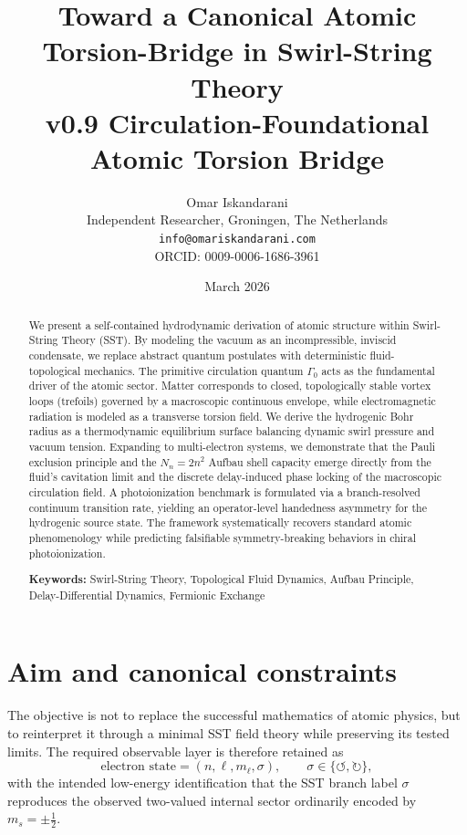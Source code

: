 \documentclass[11pt,a4paper]{article}
\title{Toward a Canonical Atomic Torsion-Bridge in Swirl-String Theory\\
\large v0.9 Circulation-Foundational Atomic Torsion Bridge}
\author{Omar Iskandarani \\
Independent Researcher, Groningen, The Netherlands \\
\texttt{info@omariskandarani.com} \\
ORCID: 0009-0006-1686-3961}
\date{March 2026}
\begin{document}
\maketitle

\begin{abstract}
We present a self-contained hydrodynamic derivation of atomic structure within Swirl-String Theory (SST). By modeling the vacuum as an incompressible, inviscid condensate, we replace abstract quantum postulates with deterministic fluid-topological mechanics. The primitive circulation quantum $\Gamma_0$ acts as the fundamental driver of the atomic sector. Matter corresponds to closed, topologically stable vortex loops (trefoils) governed by a macroscopic continuous envelope, while electromagnetic radiation is modeled as a transverse torsion field. We derive the hydrogenic Bohr radius as a thermodynamic equilibrium surface balancing dynamic swirl pressure and vacuum tension. Expanding to multi-electron systems, we demonstrate that the Pauli exclusion principle and the $N_n = 2n^2$ Aufbau shell capacity emerge directly from the fluid's cavitation limit and the discrete delay-induced phase locking of the macroscopic circulation field. A photoionization benchmark is formulated via a branch-resolved continuum transition rate, yielding an operator-level handedness asymmetry for the hydrogenic source state. The framework systematically recovers standard atomic phenomenology while predicting falsifiable symmetry-breaking behaviors in chiral photoionization.

\vspace{0.5cm}
\noindent \textbf{Keywords:} Swirl-String Theory, Topological Fluid Dynamics, Aufbau Principle, Delay-Differential Dynamics, Fermionic Exchange
\end{abstract}

\section{Aim and canonical constraints}
The objective is not to replace the successful mathematics of atomic physics, but to reinterpret it through a minimal SST field theory while preserving its tested limits. The required observable layer is therefore retained as
\begin{equation}
\label{eq:state-labels}
\text{electron state}=(n,\ell,m_\ell,\sigma),
\qquad
\sigma\in\{\!\boldsymbol{\circlearrowleft},\!\boldsymbol{\circlearrowright}\},
\end{equation}
with the intended low-energy identification that the SST branch label $\sigma$ reproduces the observed two-valued internal sector ordinarily encoded by $m_s=\pm \tfrac12$.
\end{document}
